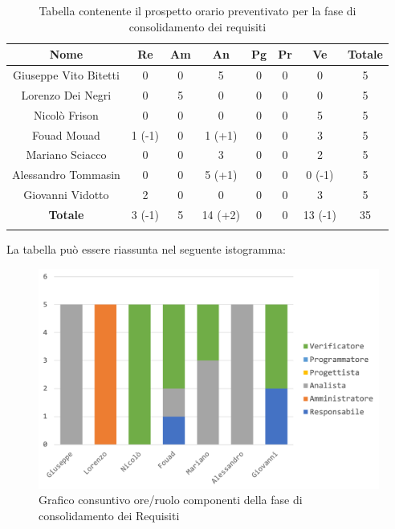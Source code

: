 			\begin{longtable}{|c|c|c|c|c|c|c|c}
				\hline
				\rowcolor{lighter-grayer}
				\textbf{Nome} & \textbf{Re} & \textbf{Am} & \textbf{An} & \textbf{Pg}  & \textbf{Pr}   & \textbf{Ve} & \textbf{Totale} \\
				\hline
				\endfirsthead
				
				\hline
				Giuseppe Vito Bitetti 	& 0 & 0 & 5 & 0 & 0 & 0 & 5\\
				\hline
				\hline
				Lorenzo Dei Negri	 	& 0 & 5 & 0 & 0 & 0 & 0 & 5\\
				\hline
				\hline
				Nicolò Frison			   & 0 & 0 & 0 & 0 & 0 & 5 & 5\\
				\hline
				\hline
				Fouad Mouad 			& 1 (-1) & 0 & 1 (+1) & 0 & 0 & 3 & 5\\
				\hline
				\hline
				Mariano Sciacco		 	& 0 & 0 & 3 & 0 & 0 & 2 & 5\\
				\hline
				\hline
				Alessandro Tommasin & 0 & 0 & 5 (+1) & 0 & 0 & 0 (-1) & 5\\
				\hline
				\hline
				Giovanni Vidotto 		 & 2 & 0 & 0 & 0 & 0 & 3 & 5\\
				\hline 
				\textbf{Totale} 			& 3 (-1) &  5 & 14 (+2) & 0 & 0 & 13 (-1) & 35\\
				\hline
				\caption{Tabella contenente il prospetto orario preventivato per la fase di consolidamento dei requisiti}
			\end{longtable}
			\pagebreak	
			
			La tabella può essere riassunta nel seguente istogramma:
			
			\begin{figure}[H]
				\centering
				\includegraphics[width=0.8\linewidth]{images/consuntivo/ConsReqCons.png}
				\caption{Grafico consuntivo ore/ruolo componenti della fase di consolidamento dei Requisiti}
				\label{fig:consuntivo grafico suddivione ruoli fase di consolidamento dei requisiti}
			\end{figure}
			
